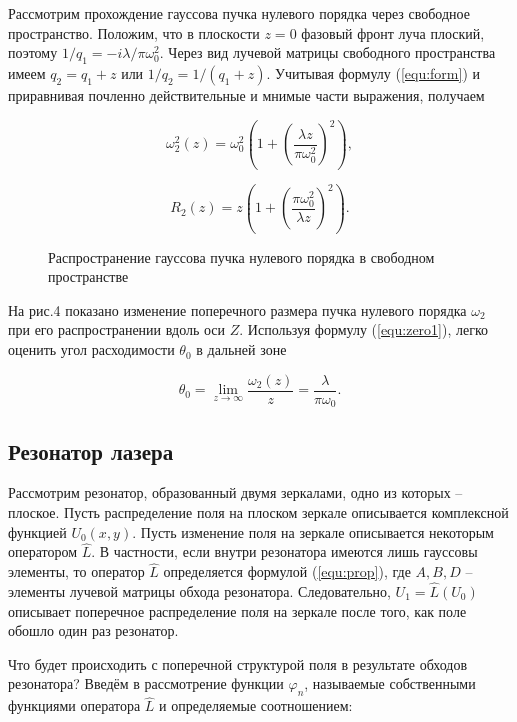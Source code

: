 \documentclass[a4paper,12pt]{article}
\begin{document}
Рассмотрим прохождение гауссова пучка нулевого порядка через свободное пространство. Положим, что в плоскости $z = 0$ фазовый фронт луча плоский, поэтому $1/q_1 = -i\lambda/{\pi\omega_0^2}$. Через вид лучевой матрицы свободного пространства имеем $q_2 = q_1 + z$ или $1/q_2 = 1/(q_1 + z)$. Учитывая формулу (\ref{equ:form}) и приравнивая почленно действительные и мнимые части выражения, получаем

\begin{equation}
    \omega_2^2(z) = \omega_0^2 (1 + (\frac{\lambda z}{\pi\omega_0^2})^2),
    \label{equ:zero1}
\end{equation}

\begin{equation}
    R_2(z) = z(1 + (\frac{\pi\omega_0^2}{\lambda z})^2).
    \label{equ:mage_of_chaos}
\end{equation}

\begin{figure}[h!]
    \caption{Распространение гауссова пучка нулевого порядка в свободном пространстве}
    \label{fig:zero_prop}
\end{figure}

На рис.4 показано изменение поперечного размера пучка нулевого порядка $\omega_2$ при его распространении вдоль оси $Z$. Используя формулу (\ref{equ:zero1}), легко оценить угол расходимости $\theta_0$ в дальней зоне

\begin{equation}
    \theta_0 = \lim_{z\to\infty} \frac{\omega_2(z)}{z} = \frac{\lambda}{\pi\omega_0}.
\end{equation}

\subsection{Резонатор лазера}

Рассмотрим резонатор, образованный двумя зеркалами, одно из которых -- плоское. Пусть распределение поля на плоском зеркале описывается комплексной функцией $U_0 (x,y)$. Пусть изменение поля на зеркале описывается некоторым оператором $\hat{L}$. В частности, если внутри резонатора имеются лишь гауссовы элементы, то оператор $\hat{L}$ определяется формулой (\ref{equ:prop}), где $A, B, D$ -- элементы лучевой матрицы обхода резонатора. Следовательно, $U_1 = \hat{L}(U_0)$ описывает поперечное распределение поля на зеркале после того, как поле обошло один раз резонатор.

Что будет происходить с поперечной структурой поля в результате обходов резонатора? Введём в рассмотрение функции $\varphi_n$, называемые собственными функциями оператора $\hat{L}$ и определяемые соотношением:
\end{document}
